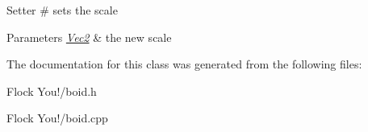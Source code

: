 Setter \# sets the scale 
\begin{DoxyParams}{Parameters}
{\em \hyperlink{struct_vec2}{Vec2}} & the new scale \\
\hline
\end{DoxyParams}


The documentation for this class was generated from the following files\+:\begin{DoxyCompactItemize}
\item 
Flock You!/boid.\+h\item 
Flock You!/boid.\+cpp\end{DoxyCompactItemize}
